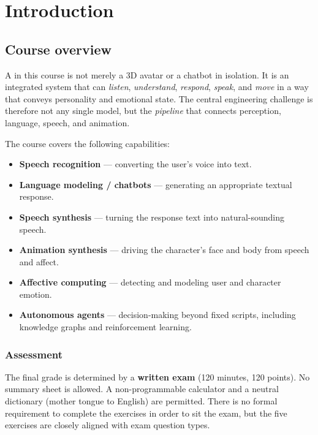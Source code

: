 \chapter{Introduction}
\label{ch:introduction}

\section{Course overview}


A  in this course is not merely a 3D avatar or a chatbot in isolation. It is an integrated system that can \emph{listen}, \emph{understand}, \emph{respond}, \emph{speak}, and \emph{move} in a way that conveys personality and emotional state. The central engineering challenge is therefore not any single model, but the \emph{pipeline} that connects perception, language, speech, and animation.

The course covers the following capabilities:
\begin{itemize}
  \item \textbf{Speech recognition} --- converting the user's voice into text.
  \item \textbf{Language modeling / chatbots} --- generating an appropriate textual response.
  \item \textbf{Speech synthesis} --- turning the response text into natural-sounding speech.
  \item \textbf{Animation synthesis} --- driving the character's face and body from speech and affect.
  \item \textbf{Affective computing} --- detecting and modeling user and character emotion.
  \item \textbf{Autonomous agents} --- decision-making beyond fixed scripts, including knowledge graphs and reinforcement learning.
\end{itemize}

\subsection{Assessment}

The final grade is determined by a \textbf{written exam} (120 minutes, 120 points). No summary sheet is allowed. A non-programmable calculator and a neutral dictionary (mother tongue to English) are permitted. There is no formal requirement to complete the exercises in order to sit the exam, but the five exercises are closely aligned with exam question types.

